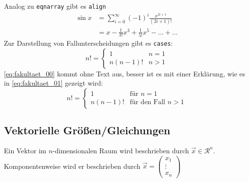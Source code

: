 \documentclass[ngerman,               %
               a4paper,               %
               fleqn,                 %
                     ]{scrartcl}       %
\begin{document}
Analog zu \texttt{eqnarray} gibt es  \texttt{align}
\begin{align}
  \label{eq:ams_sin}%
  \sin x &=  \sum_{i=0}^{\infty}(-1)^{i}\frac{x^{2i+1}}{(2i+1)!}
  \\
  \label{eq:ams_sin_expl}        &=  x - \frac{1}{3!}x^{3} + \frac{1}{5!}x^{5} - \ldots + \ldots
\end{align}
Zur Darstellung von Fallunterscheidungen gibt es \texttt{cases}:
\begin{equation}
    \label{eq:fakultaet_00}
    n! =
    \begin{cases}
      1 & n=1\\
      n(n-1)! & n > 1
    \end{cases}
\end{equation}
\cref{eq:fakultaet_00} kommt ohne Text aus, besser ist es mit einer Erklärung,
wie es in \cref{eq:fakultaet_01} gezeigt wird:
\begin{equation}
    \label{eq:fakultaet_01}
    n! =
    \begin{cases}
      1 & \text{für } n=1\\          %
      n(n-1)! & \text{für den Fall } n > 1    %
    \end{cases}
\end{equation}


\subsection{Vektorielle Größen/Gleichungen}

Ein Vektor im \(n\)-dimensionalen Raum wird beschrieben durch
\(\vec{x} \in \mathcal{R}^{n}\). Komponentenweise wird er beschrieben durch
\(\vec{x} = \left(              %
    \begin{array}{c}
      x_{1} \\ \vdots \\ x_{n}  %
    \end{array}
\right)                   %
\)
\end{document}
